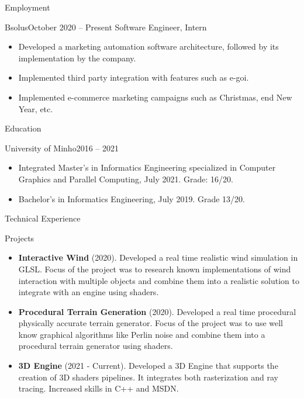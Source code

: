 \documentclass[]{mcdowellcv}
\begin{document}
	\makeheader

	\begin{cvsection}{Employment}
		\begin{cvsubsection}{Bsolus}{}{October 2020 -- Present}
			Software Engineer, Intern
			\begin{itemize}
				\item Developed a marketing automation software architecture, followed by its implementation by the company.
				\item Implemented third party integration with features such as e-goi.
				\item Implemented e-commerce marketing campaigns such as Christmas, end New Year, etc.
			\end{itemize}
		\end{cvsubsection}
	\end{cvsection}

	\begin{cvsection}{Education}
		\begin{cvsubsection}{University of Minho}{}{2016 -- 2021}
			\begin{itemize}
				\item Integrated Master’s in Informatics Engineering specialized in Computer Graphics and Parallel Computing, July 2021. Grade: 16/20.
				\item Bachelor’s in Informatics Engineering, July 2019. Grade 13/20.
			\end{itemize}
		\end{cvsubsection}
	\end{cvsection}

	\begin{cvsection}{Technical Experience}
		\begin{cvsubsection}{Projects}{}{}
			\begin{itemize}
				\item \textbf{Interactive Wind} (2020). Developed a real time realistic wind simulation in GLSL. Focus of the project was to research known implementations of wind interaction with multiple objects and combine them into a realistic solution to integrate with an engine using shaders.
				\item \textbf{Procedural Terrain Generation} (2020). Developed a real time procedural physically accurate terrain generator. Focus of the project was to use well know graphical algorithms like Perlin noise and combine them into a procedural terrain generator using shaders.
				\item \textbf{3D Engine} (2021 - Current).  Developed a 3D Engine that supports the creation of 3D shaders pipelines. It integrates both rasterization and ray tracing. Increased skills in C++ and MSDN.


			\end{itemize}
		\end{cvsubsection}
	\end{cvsection}
\end{document}
